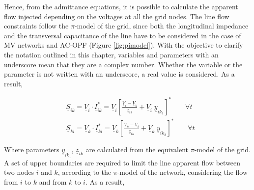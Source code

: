 Hence, from the admittance equations, it is possible to calculate the apparent flow injected depending on the voltages at all the grid nodes. 
The line flow constraints follow the $\pi$-model of the grid, since both the longitudinal impedance and the transversal capacitance of the line have to be considered in the case of MV networks and AC-OPF (Figure \ref{fig:pimodel}). With the objective to clarify the notation outlined in this chapter, variables and parameters with an underscore mean that they are a complex number. Whether the variable or the parameter is not written with an underscore, a real value is considered. As a result,

\begin{subequations}
\begin{align*}
& \underline{S}_{ik} = \underline{V}_{i} \cdot \underline{I}_{ik}^{*} = \underline{V}_{i} \left[ \frac{\underline{V}_{i} - \underline{V}_{k}}{\underline{z}_{ik}} + \underline{V}_{i} \; \underline{y}_{ik_1} \right]^{*}   \qquad  \forall t  \\
& \underline{S}_{ki} = \underline{V}_{k} \cdot \underline{I}_{ki}^{*} = \underline{V}_{k} \left[ \frac{\underline{V}_{k} - \underline{V}_{i}}{\underline{z}_{ik}} + \underline{V}_{k} \;  \underline{y}_{ik_2} \right]^{*}   \qquad  \forall t  
\end{align*}
\end{subequations}

 
Where parameters $\underline{y}_{ik_1}$,  $\underline{z}_{ik}$ are calculated from the equivalent $\pi$-model of the grid.  
%
A set of upper boundaries are required to limit the line apparent flow between two nodes $i$ and $k$, according to the $\pi$-model of the network, considering the flow from $i$ to $k$ and from $k$ to $i$. As a result, 

